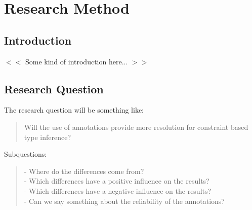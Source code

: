 \documentclass[../main.tex]{subfiles}
\begin{document}
    \chapter{Research Method}\label{chap:research_method}

    \section{Introduction}
    $<<$ Some kind of introduction here... $>>$

    \section{Research Question}
    The research question will be something like: \\
    \begin{quote}
        Will the use of annotations\footnotemark{} provide more resolution for constraint based type inference?
    \end{quote}
    Subquestions:
    \begin{quote}
        - Where do the differences come from?
        \\
        - Which differences have a positive influence on the results?
        \\
        - Which differences have a negative influence on the results?
        \\
        - Can we say something about the reliability of the annotations?
    \end{quote}
        
\end{document}
